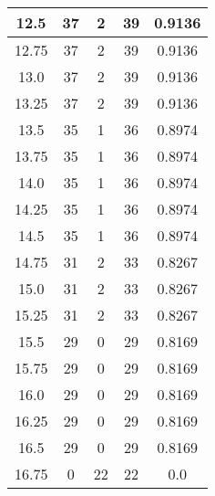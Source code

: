 \documentclass[letterpaper, 12pt]{article}
\begin{document}
\begin{longtable}{|c|c|c|c|c|}
12.5 & 37 & 2 & 39 & 0.9136 \\
\hline
12.75 & 37 & 2 & 39 & 0.9136 \\
\hline
13.0 & 37 & 2 & 39 & 0.9136 \\
\hline
13.25 & 37 & 2 & 39 & 0.9136 \\
\hline
13.5 & 35 & 1 & 36 & 0.8974 \\
\hline
13.75 & 35 & 1 & 36 & 0.8974 \\
\hline
14.0 & 35 & 1 & 36 & 0.8974 \\
\hline
14.25 & 35 & 1 & 36 & 0.8974 \\
\hline
14.5 & 35 & 1 & 36 & 0.8974 \\
\hline
14.75 & 31 & 2 & 33 & 0.8267 \\
\hline
15.0 & 31 & 2 & 33 & 0.8267 \\
\hline
15.25 & 31 & 2 & 33 & 0.8267 \\
\hline
15.5 & 29 & 0 & 29 & 0.8169 \\
\hline
15.75 & 29 & 0 & 29 & 0.8169 \\
\hline
16.0 & 29 & 0 & 29 & 0.8169 \\
\hline
16.25 & 29 & 0 & 29 & 0.8169 \\
\hline
16.5 & 29 & 0 & 29 & 0.8169 \\
\hline
16.75 & 0 & 22 & 22 & 0.0 \\
\hline
\end{longtable}
\end{document}
